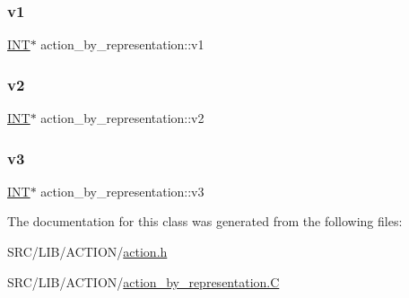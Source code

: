 \subsubsection{\texorpdfstring{v1}{v1}}
{\footnotesize\ttfamily \mbox{\hyperlink{galois_8h_a09fddde158a3a20bd2dcadb609de11dc}{I\+NT}}$\ast$ action\+\_\+by\+\_\+representation\+::v1}

\mbox{\label{classaction__by__representation_abdf1abec9353e42546298556cc44224c}} 
\subsubsection{\texorpdfstring{v2}{v2}}
{\footnotesize\ttfamily \mbox{\hyperlink{galois_8h_a09fddde158a3a20bd2dcadb609de11dc}{I\+NT}}$\ast$ action\+\_\+by\+\_\+representation\+::v2}

\mbox{\label{classaction__by__representation_a5295d18080c17544fb35473601217058}} 
\subsubsection{\texorpdfstring{v3}{v3}}
{\footnotesize\ttfamily \mbox{\hyperlink{galois_8h_a09fddde158a3a20bd2dcadb609de11dc}{I\+NT}}$\ast$ action\+\_\+by\+\_\+representation\+::v3}



The documentation for this class was generated from the following files\+:\begin{DoxyCompactItemize}
\item 
S\+R\+C/\+L\+I\+B/\+A\+C\+T\+I\+O\+N/\mbox{\hyperlink{action_8h}{action.\+h}}\item 
S\+R\+C/\+L\+I\+B/\+A\+C\+T\+I\+O\+N/\mbox{\hyperlink{action__by__representation_8_c}{action\+\_\+by\+\_\+representation.\+C}}\end{DoxyCompactItemize}
